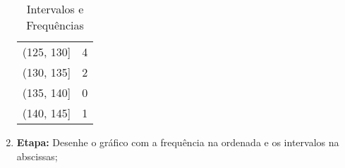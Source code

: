 \documentclass{article}
\begin{document}
\begin{enumerate}
\begin{table}[H]
\begin{tabular}[]{c|c}
                                (125, 130] & 4\\
                                (130, 135] & 2\\
                                (135, 140] & 0\\
                                (140, 145] & 1\\\hline
                            \end{tabular}
                            \caption{Intervalos e Frequências}\label{table:dataFinal}
                        \end{table}
                    \item \textbf{Etapa:} Desenhe o gráfico com a frequência na ordenada e os intervalos na abscissas;
                \end{enumerate}
\end{document}
